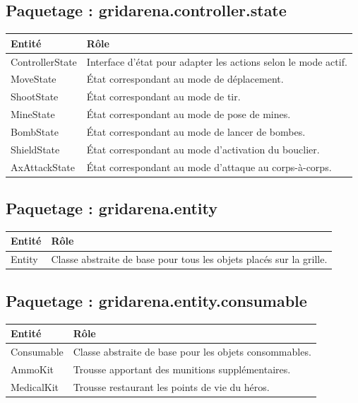 \documentclass[12pt, a4paper]{article}
\begin{document}
\subsection{Paquetage : gridarena.controller.state}
\begin{tabular}{|p{7cm}|p{8cm}|}
\hline
\textbf{Entité} & \textbf{Rôle} \\ \hline
ControllerState & Interface d'état pour adapter les actions selon le mode actif. \\ \hline
MoveState & État correspondant au mode de déplacement. \\ \hline
ShootState & État correspondant au mode de tir. \\ \hline
MineState & État correspondant au mode de pose de mines. \\ \hline
BombState & État correspondant au mode de lancer de bombes. \\ \hline
ShieldState & État correspondant au mode d'activation du bouclier. \\ \hline
AxAttackState & État correspondant au mode d'attaque au corps-à-corps. \\ \hline
\end{tabular}

\subsection{Paquetage : gridarena.entity}
\begin{tabular}{|p{7cm}|p{8cm}|}
\hline
\textbf{Entité} & \textbf{Rôle} \\ \hline
Entity & Classe abstraite de base pour tous les objets placés sur la grille. \\ \hline
\end{tabular}

\subsection{Paquetage : gridarena.entity.consumable}
\begin{tabular}{|p{7cm}|p{8cm}|}
\hline
\textbf{Entité} & \textbf{Rôle} \\ \hline
Consumable & Classe abstraite de base pour les objets consommables. \\ \hline
AmmoKit & Trousse apportant des munitions supplémentaires. \\ \hline
MedicalKit & Trousse restaurant les points de vie du héros. \\ \hline
\end{tabular}
\end{document}
